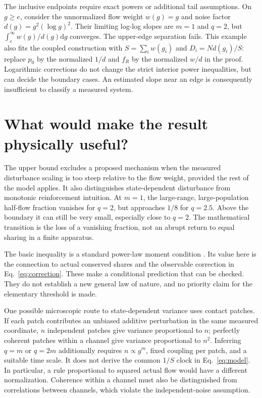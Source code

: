 \documentclass[11pt,a4paper]{article}
\newcommand{\dd}{\mathrm{d}}
\begin{document}
The inclusive endpoints require exact powers or additional tail assumptions.
On $g\geq e$, consider the unnormalized flow weight $w(g)=g$ and noise factor
$d(g)=g^2(\log g)^2$. Their limiting log-log slopes are $m=1$ and $q=2$, but
$\int_e^\infty w(g)/d(g)\dd g$ converges. The upper-edge separation fails.
This example also fits the coupled construction with $S=\sum_i w(g_i)$ and
$D_i=N d(g_i)/S$: replace $p_0$ by the normalized $1/d$ and $f_R$ by the
normalized $w/d$ in the proof. Logarithmic corrections do not change the strict
interior power inequalities, but can decide the boundary cases. An estimated
slope near an edge is consequently insufficient to classify a measured system.

\section{What would make the result physically useful?}

The upper bound excludes a proposed mechanism when the measured disturbance
scaling is too steep relative to the flow weight, provided the rest of the model
applies. It also distinguishes state-dependent disturbance from monotonic
reinforcement intuition. At $m=1$, the large-range, large-population half-flow
fraction vanishes for $q=2$, but approaches $1/8$ for $q=2.5$.
Above the boundary it can still be very small, especially close to $q=2$.
The mathematical transition is the loss of a vanishing fraction, not an abrupt
return to equal sharing in a finite apparatus.

The basic inequality is a standard power-law moment condition \cite{newman}.
Its value here is the connection to actual conserved shares and the observable
correction in Eq.~\eqref{eq:correction}. These make a conditional prediction
that can be checked. They do not establish a new general law of nature, and no
priority claim for the elementary threshold is made.

One possible microscopic route to state-dependent variance uses contact patches.
If each patch contributes an unbiased additive perturbation in the same measured
coordinate, $n$ independent patches give variance proportional to $n$; perfectly
coherent patches within a channel give variance proportional to $n^2$.
Inferring $q=m$ or $q=2m$ additionally requires $n\propto g^m$, fixed coupling
per patch, and a suitable time scale. It does not derive the common $1/S$ clock
in Eq.~\eqref{eq:model}. In particular, a rule proportional to squared actual
flow would have a different normalization. Coherence within a channel must also
be distinguished from correlations between channels, which violate the
independent-noise assumption.
\end{document}
